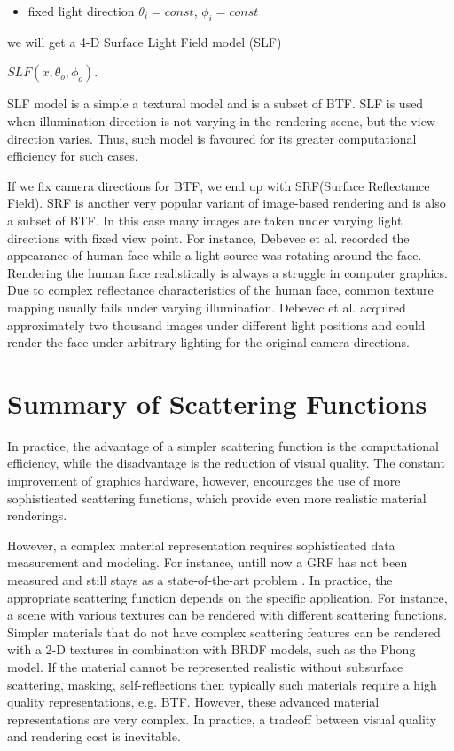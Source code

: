 \begin{itemize}
\item fixed light direction $\theta_{i} = const$, $\phi_{i}=const$
\end{itemize}
we will get a 4-D Surface Light Field model (SLF)
 \begin{center}
$SLF(x,\theta_{o} ,\phi_{o})$.
 \end{center}
 
 SLF model is a simple a textural model and is a subset of BTF. 
 SLF is used when illumination direction is not varying in the rendering scene, but the view direction varies.
 Thus, such model is favoured for its greater computational efficiency for such cases.


 If we fix camera directions for BTF, we end up with SRF(Surface Reflectance Field).
 SRF is another very popular variant of image-based rendering and is also a subset of BTF. 
 In this case many images are taken under varying light directions with fixed view point\cite{star2004}. 
 For instance, Debevec et al. \cite{debevec} recorded the appearance of human face while a
light source was rotating around the face. Rendering the human face realistically is always a struggle in computer graphics.
Due to complex reflectance characteristics of the human face, common texture mapping usually fails under varying illumination.
 Debevec et al. acquired approximately two thousand images under different light positions and could render the face under arbitrary lighting for the original camera directions. 


\section{Summary of Scattering Functions}
\label{section:attrib}
In practice, the advantage of a simpler scattering function is the computational efficiency, 
while the disadvantage is the reduction of visual quality. 
The constant improvement of graphics hardware, however, encourages the use of more sophisticated scattering functions, which provide even more realistic material renderings. 
 
However, a complex material representation requires sophisticated data measurement and modeling.
For instance, untill now a GRF has not been measured and still stays as a state-of-the-art problem \cite{haindl_visual}.
In practice, the appropriate scattering function depends on the specific application.
For instance, a scene with various textures can be rendered with different scattering functions. 
Simpler materials that do not have complex scattering features can be rendered with a 2-D textures in combination with BRDF models, such as the Phong model.
If the material cannot be represented realistic without subsurface scattering, masking, self-reflections then typically such materials require a high quality representations, e.g. BTF.
However, these advanced material representations are very complex.
In practice, a tradeoff between visual quality and rendering cost is inevitable. 




